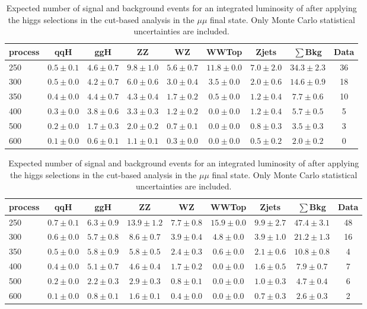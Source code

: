\begin{table}
{\footnotesize
\begin{center}
 \begin{tabular}{l c c c c c c c c }
 \hline
 process & qqH & ggH & ZZ & WZ & WWTop & Zjets & $\sum$Bkg & Data \\
 \hline
250 & $0.5\pm0.1$ & $4.6\pm0.7$ & $9.8\pm1.0$ & $5.6\pm0.7$ & $11.8\pm0.0$ & $7.0\pm2.0$ & $34.3\pm2.3$ & 36 \\
300 & $0.5\pm0.0$ & $4.2\pm0.7$ & $6.0\pm0.6$ & $3.0\pm0.4$ & $3.5\pm0.0$ & $2.0\pm0.6$ & $14.6\pm0.9$ & 18 \\
350 & $0.4\pm0.0$ & $4.4\pm0.7$ & $4.3\pm0.4$ & $1.7\pm0.2$ & $0.5\pm0.0$ & $1.2\pm0.4$ & $7.7\pm0.6$ & 10 \\
400 & $0.3\pm0.0$ & $3.8\pm0.6$ & $3.3\pm0.3$ & $1.2\pm0.2$ & $0.0\pm0.0$ & $1.2\pm0.4$ & $5.7\pm0.5$ & 5 \\
500 & $0.2\pm0.0$ & $1.7\pm0.3$ & $2.0\pm0.2$ & $0.7\pm0.1$ & $0.0\pm0.0$ & $0.8\pm0.3$ & $3.5\pm0.3$ & 3 \\
600 & $0.1\pm0.0$ & $0.6\pm0.1$ & $1.1\pm0.1$ & $0.3\pm0.0$ & $0.0\pm0.0$ & $0.5\pm0.2$ & $2.0\pm0.2$ & 0 \\
\hline
\end{tabular}
\end{center}
}
\caption{Expected number of signal and background events for an 
  integrated luminosity of \intlumi after applying the higgs selections in the cut-based analysis in the ee final state. 
  Only Monte Carlo statistical uncertainties are included. }
\label{tab:yield_cutbased_ee}
{\footnotesize
 \begin{center}
 \begin{tabular}{l c c c c c c c c }
 \hline
 process & qqH & ggH & ZZ & WZ & WWTop & Zjets & $\sum$Bkg & Data \\
 \hline
250 & $0.7\pm0.1$ & $6.3\pm0.9$ & $13.9\pm1.2$ & $7.7\pm0.8$ & $15.9\pm0.0$ & $9.9\pm2.7$ & $47.4\pm3.1$ & 48 \\
300 & $0.6\pm0.0$ & $5.7\pm0.8$ & $8.6\pm0.7$ & $3.9\pm0.4$ & $4.8\pm0.0$ & $3.9\pm1.0$ & $21.2\pm1.3$ & 16 \\
350 & $0.5\pm0.0$ & $5.8\pm0.9$ & $5.8\pm0.5$ & $2.4\pm0.3$ & $0.6\pm0.0$ & $2.1\pm0.6$ & $10.8\pm0.8$ & 4 \\
400 & $0.4\pm0.0$ & $5.1\pm0.7$ & $4.6\pm0.4$ & $1.7\pm0.2$ & $0.0\pm0.0$ & $1.6\pm0.5$ & $7.9\pm0.7$ & 7 \\
500 & $0.2\pm0.0$ & $2.2\pm0.3$ & $2.9\pm0.3$ & $0.8\pm0.1$ & $0.0\pm0.0$ & $1.0\pm0.3$ & $4.7\pm0.4$ & 6 \\
600 & $0.1\pm0.0$ & $0.8\pm0.1$ & $1.6\pm0.1$ & $0.4\pm0.0$ & $0.0\pm0.0$ & $0.7\pm0.3$ & $2.6\pm0.3$ & 2 \\
\hline
\end{tabular}
\end{center}
}
\caption{Expected number of signal and background events for an 
  integrated luminosity of \intlumi after applying the higgs selections in the cut-based analysis in the $\mu\mu$ final state. 
  Only Monte Carlo statistical uncertainties are included. }
\label{tab:yield_cutbased_mm}
\end{table}
